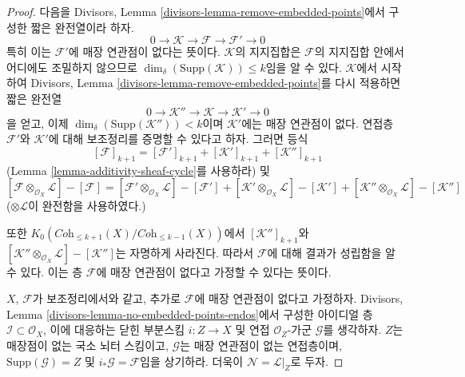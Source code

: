 \begin{proof}
다음을 Divisors, Lemma \ref{divisors-lemma-remove-embedded-points}에서
구성한 짧은 완전열이라 하자.
$$
0 \to \mathcal{K} \to \mathcal{F} \to \mathcal{F}' \to 0
$$
특히 이는 $\mathcal{F}'$에 매장 연관점이 없다는 뜻이다.
$\mathcal{K}$의 지지집합은 $\mathcal{F}$의 지지집합 안에서 어디에도
조밀하지 않으므로
$\dim_\delta(\text{Supp}(\mathcal{K})) \leq k$임을 알 수 있다.
$\mathcal{K}$에서 시작하여 Divisors, Lemma
\ref{divisors-lemma-remove-embedded-points}를 다시 적용하면 짧은
완전열
$$
0 \to \mathcal{K}'' \to \mathcal{K} \to \mathcal{K}' \to 0
$$
을 얻고, 이제 $\dim_\delta(\text{Supp}(\mathcal{K}'')) < k$이며
$\mathcal{K}'$에는 매장 연관점이 없다. 연접층 $\mathcal{F}'$와
$\mathcal{K}'$에 대해 보조정리를 증명할 수 있다고 하자. 그러면 등식
$$
[\mathcal{F}]_{k + 1}
=
[\mathcal{F}']_{k + 1}
+ [\mathcal{K}']_{k + 1}
+ [\mathcal{K}'']_{k + 1}
$$
(Lemma \ref{lemma-additivity-sheaf-cycle}를 사용하라) 및
$$
[\mathcal{F} \otimes_{\mathcal{O}_X} \mathcal{L}]
-
[\mathcal{F}]
=
[\mathcal{F}' \otimes_{\mathcal{O}_X} \mathcal{L}]
-
[\mathcal{F}']
+
[\mathcal{K}' \otimes_{\mathcal{O}_X} \mathcal{L}]
-
[\mathcal{K}']
+
[\mathcal{K}'' \otimes_{\mathcal{O}_X} \mathcal{L}]
-
[\mathcal{K}'']
$$
($\otimes \mathcal{L}$이 완전함을 사용하였다.)

또한 $K_0(\textit{Coh}_{\leq k + 1}(X)/\textit{Coh}_{\leq k - 1}(X))$에서
$[\mathcal{K}'']_{k + 1}$와
$[\mathcal{K}'' \otimes_{\mathcal{O}_X} \mathcal{L}]
- [\mathcal{K}'']$는 자명하게 사라진다. 따라서 $\mathcal{F}$에 대해 결과가
성립함을 알 수 있다. 이는 층 $\mathcal{F}$에 매장 연관점이 없다고
가정할 수 있다는 뜻이다.

\medskip\noindent
$X$, $\mathcal{F}$가 보조정리에서와 같고, 추가로 $\mathcal{F}$에
매장 연관점이 없다고 가정하자. Divisors, Lemma
\ref{divisors-lemma-no-embedded-points-endos}에서 구성한 아이디얼 층
$\mathcal{I} \subset \mathcal{O}_X$, 이에 대응하는 닫힌 부분스킴
$i : Z \to X$ 및 연접 $\mathcal{O}_Z$-가군 $\mathcal{G}$를 생각하자.
$Z$는 매장점이 없는 국소 뇌터 스킴이고, $\mathcal{G}$는 매장
연관점이 없는 연접층이며,
$\text{Supp}(\mathcal{G}) = Z$ 및 $i_*\mathcal{G} = \mathcal{F}$임을
상기하라. 더욱이 $\mathcal{N} = \mathcal{L}|_Z$로 두자.


\end{proof}
